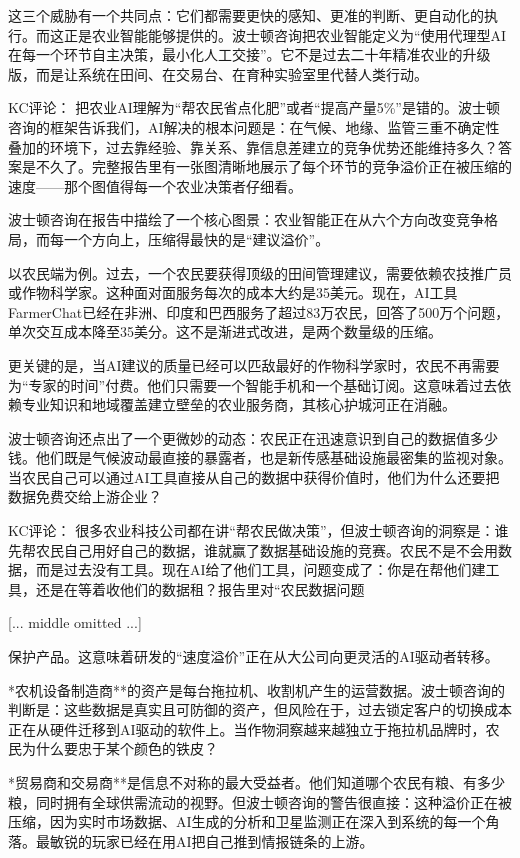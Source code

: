 \documentclass[11pt]{ctexart}
\begin{document}
这三个威胁有一个共同点：它们都需要更快的感知、更准的判断、更自动化的执行。而这正是农业智能能够提供的。波士顿咨询把农业智能定义为“使用代理型AI在每一个环节自主决策，最小化人工交接”。它不是过去二十年精准农业的升级版，而是让系统在田间、在交易台、在育种实验室里代替人类行动。

KC评论： 把农业AI理解为“帮农民省点化肥”或者“提高产量5\%”是错的。波士顿咨询的框架告诉我们，AI解决的根本问题是：在气候、地缘、监管三重不确定性叠加的环境下，过去靠经验、靠关系、靠信息差建立的竞争优势还能维持多久？答案是不久了。完整报告里有一张图清晰地展示了每个环节的竞争溢价正在被压缩的速度——那个图值得每一个农业决策者仔细看。

波士顿咨询在报告中描绘了一个核心图景：农业智能正在从六个方向改变竞争格局，而每一个方向上，压缩得最快的是“建议溢价”。

以农民端为例。过去，一个农民要获得顶级的田间管理建议，需要依赖农技推广员或作物科学家。这种面对面服务每次的成本大约是35美元。现在，AI工具FarmerChat已经在非洲、印度和巴西服务了超过83万农民，回答了500万个问题，单次交互成本降至35美分。这不是渐进式改进，是两个数量级的压缩。

更关键的是，当AI建议的质量已经可以匹敌最好的作物科学家时，农民不再需要为“专家的时间”付费。他们只需要一个智能手机和一个基础订阅。这意味着过去依赖专业知识和地域覆盖建立壁垒的农业服务商，其核心护城河正在消融。

波士顿咨询还点出了一个更微妙的动态：农民正在迅速意识到自己的数据值多少钱。他们既是气候波动最直接的暴露者，也是新传感基础设施最密集的监视对象。当农民自己可以通过AI工具直接从自己的数据中获得价值时，他们为什么还要把数据免费交给上游企业？

KC评论： 很多农业科技公司都在讲“帮农民做决策”，但波士顿咨询的洞察是：谁先帮农民自己用好自己的数据，谁就赢了数据基础设施的竞赛。农民不是不会用数据，而是过去没有工具。现在AI给了他们工具，问题变成了：你是在帮他们建工具，还是在等着收他们的数据租？报告里对“农民数据问题

[... middle omitted ...]

保护产品。这意味着研发的“速度溢价”正在从大公司向更灵活的AI驱动者转移。

*农机设备制造商**的资产是每台拖拉机、收割机产生的运营数据。波士顿咨询的判断是：这些数据是真实且可防御的资产，但风险在于，过去锁定客户的切换成本正在从硬件迁移到AI驱动的软件上。当作物洞察越来越独立于拖拉机品牌时，农民为什么要忠于某个颜色的铁皮？

*贸易商和交易商**是信息不对称的最大受益者。他们知道哪个农民有粮、有多少粮，同时拥有全球供需流动的视野。但波士顿咨询的警告很直接：这种溢价正在被压缩，因为实时市场数据、AI生成的分析和卫星监测正在深入到系统的每一个角落。最敏锐的玩家已经在用AI把自己推到情报链条的上游。
\end{document}

